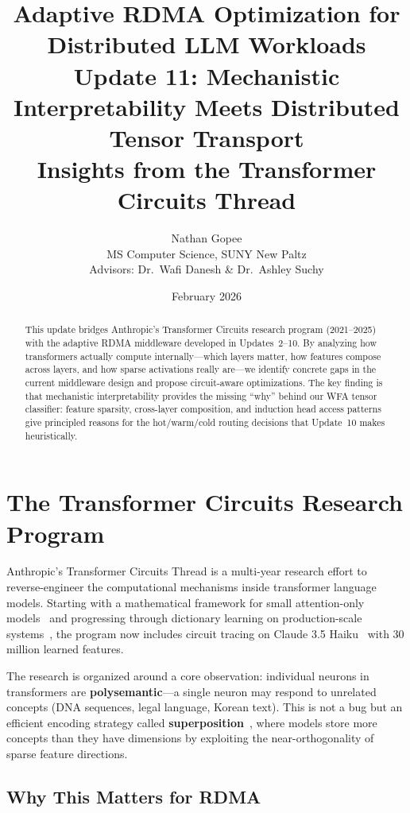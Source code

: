 \documentclass[11pt,letterpaper]{article}
\title{\textbf{Adaptive RDMA Optimization for Distributed LLM Workloads}\\[0.5em]
\large Update 11: Mechanistic Interpretability Meets Distributed Tensor Transport\\[0.3em]
\normalsize Insights from the Transformer Circuits Thread}
\author{Nathan Gopee\\
MS Computer Science, SUNY New Paltz\\
Advisors: Dr.\ Wafi Danesh \& Dr.\ Ashley Suchy}
\date{February 2026}
\begin{document}
\maketitle

\begin{abstract}
\noindent
This update bridges Anthropic's Transformer Circuits research program (2021--2025) with the adaptive RDMA middleware developed in Updates~2--10. By analyzing how transformers actually compute internally---which layers matter, how features compose across layers, and how sparse activations really are---we identify concrete gaps in the current middleware design and propose circuit-aware optimizations. The key finding is that mechanistic interpretability provides the missing ``why'' behind our WFA tensor classifier: feature sparsity, cross-layer composition, and induction head access patterns give principled reasons for the hot/warm/cold routing decisions that Update~10 makes heuristically.
\end{abstract}

\tableofcontents
\newpage

\section{The Transformer Circuits Research Program}
\label{sec:circuits-overview}

Anthropic's Transformer Circuits Thread is a multi-year research effort to reverse-engineer the computational mechanisms inside transformer language models. Starting with a mathematical framework for small attention-only models~\cite{elhage2021framework} and progressing through dictionary learning on production-scale systems~\cite{templeton2024scaling}, the program now includes circuit tracing on Claude 3.5 Haiku~\cite{lindsey2025biology} with 30 million learned features.

The research is organized around a core observation: individual neurons in transformers are \textbf{polysemantic}---a single neuron may respond to unrelated concepts (DNA sequences, legal language, Korean text). This is not a bug but an efficient encoding strategy called \textbf{superposition}~\cite{elhage2022superposition}, where models store more concepts than they have dimensions by exploiting the near-orthogonality of sparse feature directions.

\subsection{Why This Matters for RDMA}
\end{document}
